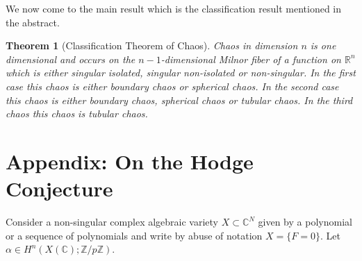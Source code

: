 \documentclass[10pt,a4paper]{amsart}
\newtheorem{theorem}{Theorem}
\begin{document}
We now come to the main result which is the classification result mentioned in the abstract.

\begin{theorem}[Classification Theorem of Chaos]
    Chaos in dimension $n$ is one dimensional and occurs on the $n-1$-dimensional Milnor fiber of a function on $\mathbb{R}^n$ which is either singular isolated, singular non-isolated or non-singular. In the first case this chaos is either boundary chaos or spherical chaos. In the second case this chaos is either boundary chaos, spherical chaos or tubular chaos. In the third chaos this chaos is tubular chaos.
\end{theorem}

\section{Appendix: On the Hodge Conjecture}
Consider a non-singular complex algebraic variety $X\subset \mathbb{C}^N$ given by a polynomial or a sequence of polynomials and write by abuse of notation $X=\{F=0\}$. Let $\alpha\in H^n(X(\mathbb{C}); \mathbb{Z}/p\mathbb{Z})$. 
\end{document}
